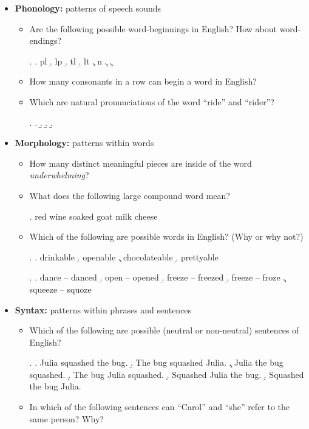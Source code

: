 \documentclass[11pt, oneside]{article}   	%
\begin{document}
\begin{itemize}
\item {\bf Phonology:} patterns of speech sounds
\begin{itemize}
\item Are the following possible word-beginnings in English? How about word-endings?

\ex. \a. pl
\b. lp
\b. tl%
\b. lt
\c. n
\c. 
\c. 

\item How many consonants in a row can begin a word in English?
\item Which are natural pronunciations of the word ``ride'' and ``rider''?

\ex. \a. 
\b. 
\b. 
\b. 

\end{itemize}
\item {\bf Morphology:} patterns within words
\begin{itemize}
\item How many distinct meaningful pieces are inside of the word \textit{underwhelming}?
\item What does the following large compound word mean?

\ex. red wine soaked goat milk cheese

\item Which of the following are possible words in English? (Why or why not?)

\ex. \a. drinkable
\b. openable
\c. chocolateable
\d. prettyable

\ex. \a. dance -- danced
\b. open -- opened
\b. freeze -- freezed
\b. freeze -- froze
\c. squeeze -- squoze

\end{itemize}
\item {\bf Syntax:} patterns within phrases and sentences
\begin{itemize}
\item Which of the following are possible (neutral or non-neutral) sentences of English?

\ex. \a. Julia squashed the bug. %
\b. The bug squashed Julia. %
\c. Julia the bug squashed. %
\d. The bug Julia squashed. %
\d. Squashed Julia the bug. %
\d. Squashed the bug Julia. %

\item In which of the following sentences can ``Carol'' and ``she'' refer to the same person? Why?


\end{itemize}
\end{itemize}
\end{document}
